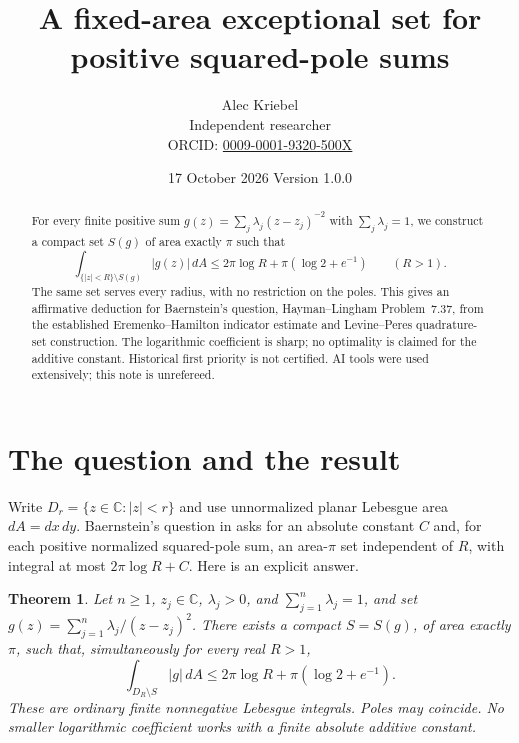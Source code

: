 \documentclass[11pt]{article}
\title{A fixed-area exceptional set for positive squared-pole sums}
\author{Alec Kriebel\\ \small Independent researcher\\
\small ORCID: \href{https://orcid.org/0009-0001-9320-500X}{0009-0001-9320-500X}}
\date{17 October 2026 \quad Version 1.0.0}
\newtheorem{theorem}{Theorem}
\newcommand{\C}{\mathbb C}
\newcommand{\dd}{\,dA}
\begin{document}
\maketitle
\begin{abstract}
For every finite positive sum \(g(z)=\sum_j\lambda_j(z-z_j)^{-2}\)
with \(\sum_j\lambda_j=1\), we construct a compact set \(S(g)\) of
area exactly \(\pi\) such that
\[
 \int_{\{|z|<R\}\setminus S(g)}|g(z)|\dd
 \le 2\pi\log R+\pi(\log2+e^{-1})\qquad(R>1).
\]
The same set serves every radius, with no restriction on the poles.
This gives an affirmative deduction for Baernstein's question,
Hayman--Lingham Problem~7.37, from the established
Eremenko--Hamilton indicator estimate and Levine--Peres quadrature-set
construction. The logarithmic coefficient is sharp; no optimality is
claimed for the additive constant. Historical first priority is not
certified. AI tools were used extensively; this note is unrefereed.
\end{abstract}

\section{The question and the result}
Write \(D_r=\{z\in\C:|z|<r\}\) and use unnormalized planar Lebesgue
area \(dA=dx\,dy\). Baernstein's question in \cite[Problem~7.37,
printed pp.~171--172]{HL} asks for an absolute constant \(C\) and,
for each positive normalized squared-pole sum, an area-\(\pi\) set
independent of \(R\), with integral at most \(2\pi\log R+C\).
Here is an explicit answer.
\begin{theorem}\label{thm}
Let \(n\ge1\), \(z_j\in\C\), \(\lambda_j>0\), and
\(\sum_{j=1}^n\lambda_j=1\), and set
\(g(z)=\sum_{j=1}^n\lambda_j/(z-z_j)^2\).
There exists a compact \(S=S(g)\), of area exactly \(\pi\), such that,
simultaneously for every real \(R>1\),
\begin{equation}\label{main}
 \int_{D_R\setminus S}|g|\dd
 \le 2\pi\log R+\pi(\log2+e^{-1}).
\end{equation}
These are ordinary finite nonnegative Lebesgue integrals. Poles may
coincide. No smaller logarithmic coefficient works with a finite
absolute additive constant.
\end{theorem}
\end{document}
